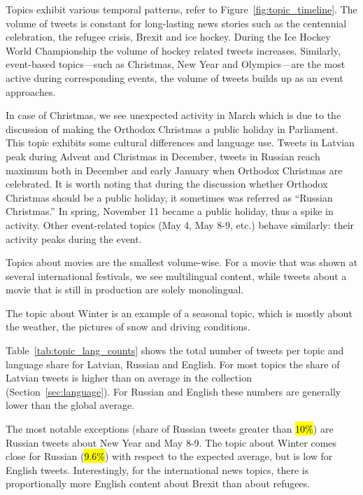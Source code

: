 \documentclass{IOS-Book-Article}
\begin{document}
Topics exhibit various temporal patterns, refer to Figure~\ref{fig:topic_timeline}. The volume of tweets is constant for long-lasting news stories such as the centennial celebration, the refugee crisis, Brexit and ice hockey.
%
During the Ice Hockey World Championship the volume of hockey related tweets increases. Similarly, event-based topics---such as Christmas, New Year and Olympics---are the most active during corresponding events, the volume of tweets builds up as an event approaches.

In case of Christmas, we see unexpected activity in March which is due to the discussion of making the Orthodox Christmas a public holiday in Parliament. This topic exhibits some cultural differences and language use. Tweets in Latvian peak during Advent and Christmas in December, tweets in Russian reach maximum both in December and early January when Orthodox Christmas are celebrated. It is worth noting that during the discussion whether Orthodox Christmas should be a public holiday, it sometimes was referred as ``Russian Christmas.'' In spring, November 11 became a public holiday, thus a spike in activity.  Other event-related topics (May 4, May 8-9, etc.) behave similarly: their activity peaks during the event.

Topics about movies are the smallest volume-wise. For a movie that was shown at several international festivals, we see multilingual content, while tweets about a movie that is still in production are solely monolingual.

The topic about Winter is an example of a seasonal topic, which is mostly about the weather, the pictures of snow and driving conditions.

Table~\ref{tab:topic_lang_counts} shows the total number of tweets per topic and language share for Latvian, Russian and English. For most topics the share of Latvian tweets is higher than on average in the collection (Section~\ref{sec:language}). For Russian and English these numbers are generally lower than the global average.

The most notable exceptions (share of Russian tweets greater than \hl{10\%}) are Russian tweets about New Year and May 8-9. The topic about Winter comes close for Russian (\hl{9.6\%}) with respect to the expected average, but is low for English tweets. Interestingly, for the international news topics, there is proportionally more English content about Brexit than about refugees.
\end{document}
